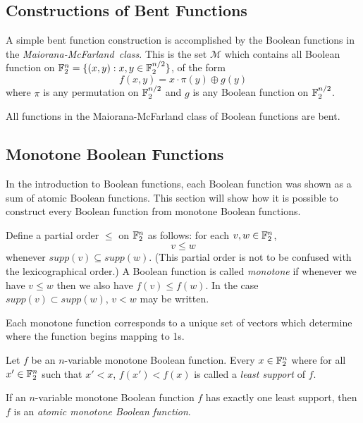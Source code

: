 
\subsection{Constructions of Bent Functions}\label{subsec:bent-constructions}
\par A simple bent function construction is accomplished by the Boolean
functions in the {\em Maiorana-McFarland\ class}. This is the set
$\mathcal{M}$ which contains all Boolean function on
$\mathbb{F}_2^n=\{(x,y):x,y\in\mathbb{F}_2^{n/2}\}$, of the form
  \[
  f(x,y)=x\cdot\pi(y)\oplus g(y)
  \]
where $\pi$ is any permutation on $\mathbb{F}_2^{n/2}$ and $g$ is any Boolean
function on $\mathbb{F}_2^{n/2}$.

\par All functions in the Maiorana-McFarland class of Boolean functions are
bent.


\subsection{Monotone Boolean Functions}
\par In the introduction to Boolean functions, each Boolean function was
shown as a sum of atomic Boolean functions. This section will show how it is
possible to construct every Boolean function from monotone Boolean
functions.

\par Define a partial order $\leq $ on $\mathbb{F}_2^n$ as follows:
for each $v,w\in \mathbb{F}_2^n$,
\[
v\leq w
\]
whenever $supp(v)\subseteq supp(w)$.
(This partial order is not to be confused with the lexicographical order.)
A Boolean function is called {\it monotone} if whenever we have $v\leq w$
then we also have $f(v) \leq f(w)$. In the case $supp(v)\subset supp(w)$,
$v<w$ may be written.

\par Each monotone function corresponds to a unique set of vectors which
determine where the function begins mapping to 1s.

\begin{definition}
  Let $f$ be an $n$-variable monotone Boolean function. Every $x\in\mathbb{F}_2^n$
  where for all $x'\in\mathbb{F}_2^n$ such that $x'<x$, $f(x')<f(x)$ is called a
  \textit{least support} of $f$.
\end{definition}

\begin{definition}
  If an $n$-variable monotone Boolean function $f$ has exactly one least
  support, then $f$ is an \textit{atomic monotone Boolean function}.
\end{definition}

